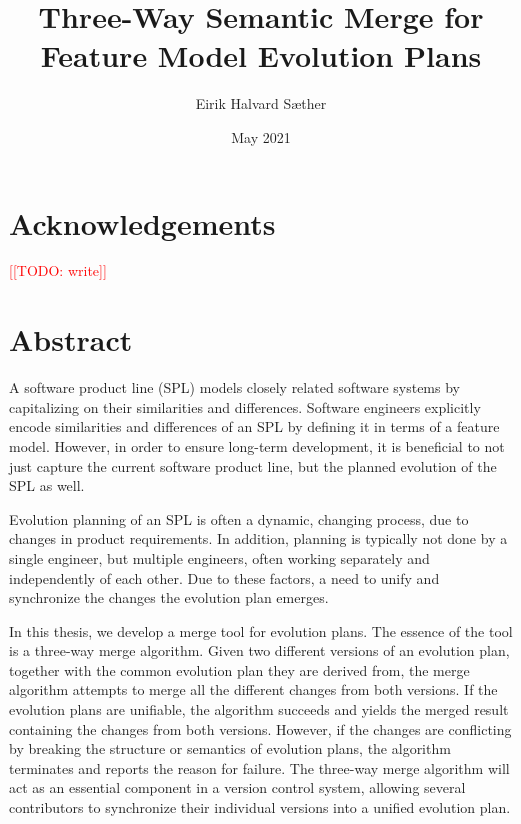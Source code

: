 \documentclass[a4paper,english]{ifimaster}
\title{Three-Way Semantic Merge for Feature Model Evolution Plans}
\date{May 2021}
\author{Eirik Halvard Sæther}
\newcommand{\todo}[1]{\textcolor{red}{[[TODO: #1]]}\PackageWarning{TODO:}{#1!}}
\begin{document}
\duoforside[dept={Department of Informatics},
program={Informatics: Programming and Systems Architecture},
long]
\frontmatter{}

\chapter*{Acknowledgements}

\todo{write}





\newpage
\thispagestyle{empty}
\mbox{}
\chapter*{Abstract}

A software product line (SPL) models closely related software systems by capitalizing on their similarities and differences. Software engineers explicitly encode similarities and differences of an SPL by defining it in terms of a feature model. However, in order to ensure long-term development, it is beneficial to not just capture the current software product line, but the planned evolution of the SPL as well.

Evolution planning of an SPL is often a dynamic, changing process, due to changes in product requirements. In addition, planning is typically not done by a single engineer, but multiple engineers, often working separately and independently of each other. Due to these factors, a need to unify and synchronize the changes the evolution plan emerges.

In this thesis, we develop a merge tool for evolution plans. The essence of the tool is a three-way merge algorithm. Given two different versions of an evolution plan, together with the common evolution plan they are derived from, the merge algorithm attempts to merge all the different changes from both versions. If the evolution plans are unifiable, the algorithm succeeds and yields the merged result containing the changes from both versions. However, if the changes are conflicting by breaking the structure or semantics of evolution plans, the algorithm terminates and reports the reason for failure. The three-way merge algorithm will act as an essential component in a version control system, allowing several contributors to synchronize their individual versions into a unified evolution plan.
\end{document}
